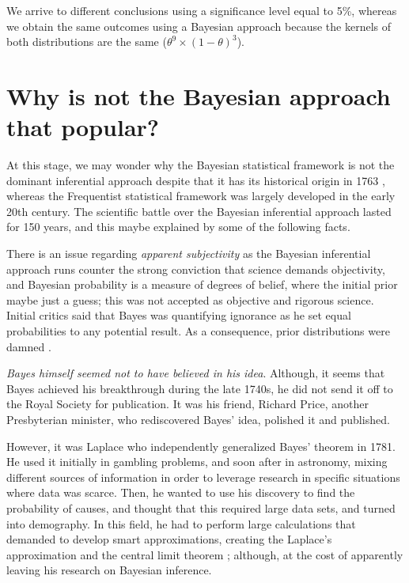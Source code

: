 We arrive to different conclusions using a significance level equal to 5\%, whereas we obtain the same outcomes using a Bayesian approach because the kernels of both distributions are the same ($\theta^9\times(1-\theta)^3$).



\section{Why is not the Bayesian approach that popular?}\label{sec25}

At this stage, we may wonder why the Bayesian statistical framework is not the dominant inferential approach despite that it has its historical origin in 1763 \cite{bayes1763lii}, whereas the Frequentist statistical framework was largely developed in the early 20th century. The scientific battle over the Bayesian inferential approach lasted for 150 years, and this maybe explained by some of the following facts.

There is an issue regarding \textit{apparent subjectivity} as the Bayesian inferential approach runs counter the strong conviction that science demands objectivity, and Bayesian probability is a measure of degrees of belief, where the initial prior maybe just a guess; this was not accepted as objective and rigorous science. Initial critics said that Bayes was quantifying ignorance as he set equal probabilities to any potential result. As a consequence, prior distributions were damned \cite{mcgrayne2011theory}.

\textit{Bayes himself seemed not to have believed in his idea}. Although, it seems that Bayes achieved his breakthrough during the late 1740s, he did not send it off to the Royal Society for publication. It was his friend, Richard Price, another Presbyterian minister, who rediscovered Bayes' idea, polished it and published.           

However, it was Laplace who independently generalized Bayes' theorem  in 1781. He used it initially in gambling problems, and soon after in astronomy, mixing different sources of information in order to leverage research in specific situations where data was scarce. Then, he wanted to use his discovery to find the probability of causes, and thought that this required large data sets, and turned into demography. In this field, he had to perform large calculations that demanded to develop smart approximations, creating the Laplace's approximation and the central limit theorem \cite{Laplace1812}; although, at the cost of apparently leaving his research on Bayesian inference.

